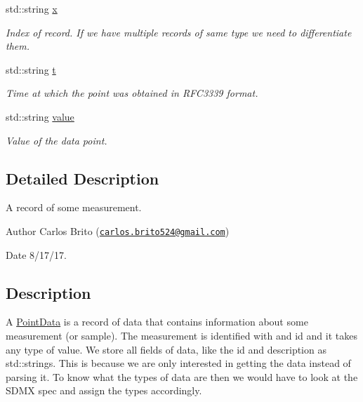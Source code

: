 \begin{DoxyCompactItemize}
std\+::string \hyperlink{structsunspec_1_1data_1_1_point_data_a5c7544aa90af8105a9fe0571518f474a}{x}
\begin{DoxyCompactList}\small\item\em Index of record. If we have multiple records of same type we need to differentiate them. \end{DoxyCompactList}\item 
\mbox{\label{structsunspec_1_1data_1_1_point_data_ab8da416982508faabd9ac09ab407bc5f}} 
std\+::string \hyperlink{structsunspec_1_1data_1_1_point_data_ab8da416982508faabd9ac09ab407bc5f}{t}
\begin{DoxyCompactList}\small\item\em Time at which the point was obtained in R\+F\+C3339 format. \end{DoxyCompactList}\item 
\mbox{\label{structsunspec_1_1data_1_1_point_data_a669ad65a5985a90717b48a89bf5efe26}} 
std\+::string \hyperlink{structsunspec_1_1data_1_1_point_data_a669ad65a5985a90717b48a89bf5efe26}{value}
\begin{DoxyCompactList}\small\item\em Value of the data point. \end{DoxyCompactList}\end{DoxyCompactItemize}


\subsection{Detailed Description}
A record of some measurement. 

\begin{DoxyAuthor}{Author}
Carlos Brito (\href{mailto:carlos.brito524@gmail.com}{\tt carlos.\+brito524@gmail.\+com}) 
\end{DoxyAuthor}
\begin{DoxyDate}{Date}
8/17/17.
\end{DoxyDate}
\subsection*{Description}

A {\ttfamily \hyperlink{structsunspec_1_1data_1_1_point_data}{Point\+Data}} is a record of data that contains information about some measurement (or sample). The measurement is identified with and id and it takes any type of value. We store all fields of data, like the {\ttfamily id} and {\ttfamily description} as {\ttfamily std\+::strings}. This is because we are only interested in getting the data instead of parsing it. To know what the types of data are then we would have to look at the S\+D\+MX spec and assign the types accordingly. 

